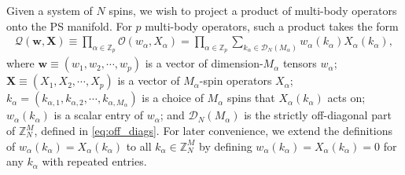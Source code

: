 \documentclass[nofootinbib,notitlepage,11pt]{revtex4-2}
\newcommand{\p}[1]{\left(#1\right)} %
\newcommand{\m}{\bm} %
\newcommand{\1}{\mathds{1}}
\newcommand{\D}{\mathcal{D}}
\renewcommand{\O}{\mathcal{O}}
\newcommand{\Q}{\mathcal{Q}}
\newcommand{\ZZ}{\mathbb{Z}}
\begin{document}
Given a system of $N$ spins, we wish to project a product of
multi-body operators onto the PS manifold.  For $p$ multi-body
operators, such a product takes the form
\begin{align}
  \Q\p{\m w,\m X}
  \equiv \prod_{\alpha\in\ZZ_p} \O\p{w_\alpha,X_\alpha}
  = \prod_{\alpha\in\ZZ_p} \sum_{k_\alpha\in\D_N\p{M_\alpha}}
  w_\alpha\p{k_\alpha} X_\alpha\p{k_\alpha},
  \label{eq:sym_prod_start}
\end{align}
where $\m w\equiv\p{w_1,w_2,\cdots,w_p}$ is a vector of
dimension-$M_\alpha$ tensors $w_\alpha$;
$\m X\equiv\p{X_1,X_2,\cdots,X_p}$ is a vector of $M_\alpha$-spin
operators $X_\alpha$;
$k_\alpha=\p{k_{\alpha,1},k_{\alpha,2},\cdots,k_{\alpha,M_\alpha}}$ is
a choice of $M_\alpha$ spins that $X_\alpha\p{k_\alpha}$ acts on;
$w_\alpha\p{k_\alpha}$ is a scalar entry of $w_\alpha$; and
$\D_N\p{M_\alpha}$ is the strictly off-diagonal part of $\ZZ_N^M$,
defined in \eqref{eq:off_diags}.  For later convenience, we extend the
definitions of $w_\alpha\p{k_\alpha}=X_\alpha\p{k_\alpha}$ to all
$k_\alpha\in\ZZ_N^M$ by defining
$w_\alpha\p{k_\alpha}=X_\alpha\p{k_\alpha}=0$ for any $k_\alpha$ with
repeated entries.
\end{document}
